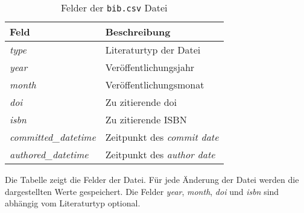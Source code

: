 \begin{table}
    \centering
    \begin{tabularx}{\textwidth}{XL{10.2cm}}
        \toprule
        \textbf{Feld}              & \textbf{Beschreibung}                  \\ \midrule
        \emph{type}                & Literaturtyp der  Datei \\
        \emph{year}                & Veröffentlichungsjahr                  \\
        \emph{month}               & Veröffentlichungsmonat                 \\
        \emph{doi}                 & Zu zitierende \gls{doi}                \\
        \emph{isbn}                & Zu zitierende ISBN                     \\
        \emph{committed\_datetime} & Zeitpunkt des \emph{commit date}       \\
        \emph{authored\_datetime}  & Zeitpunkt des \emph{author date}       \\
        \bottomrule
    \end{tabularx}
    \caption{Felder der \texttt{bib.csv} Datei}
    \label{tab:bib}
    \small
    \raggedright
    Die Tabelle zeigt die Felder der  Datei. Für jede Änderung der  Datei werden die dargestellten Werte gespeichert. Die Felder \emph{year}, \emph{month}, \emph{doi} und \emph{isbn} sind abhängig vom Literaturtyp optional.
\end{table}
